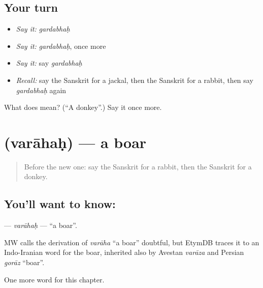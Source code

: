 \subsection*{Your turn}
\begin{itemize}
\raggedright
  \item \emph{Say it:} \emph{gardabhaḥ}
  \item \emph{Say it:} \emph{gardabhaḥ}, once more
  \item \emph{Say it:} say \emph{gardabhaḥ}
  \item \emph{Recall:} say the Sanskrit for a jackal, then the Sanskrit for a rabbit, then say \emph{gardabhaḥ} again
\end{itemize}

\begin{tcolorbox}[breakable,colback=teal!4,colframe=teal!35!black,title={Before you move on}]
What does  mean? (\textquotedblleft{}A donkey\textquotedblright{}.) Say it once more.
\end{tcolorbox}
\section[\texorpdfstring{\sk{वराहः} (varāhaḥ)}{वराहः (varāhaḥ)}]{ (varāhaḥ) — a boar}

\label{lesson:SA-C113-varahah}



\begin{quote}
Before the new one: say the Sanskrit for a rabbit, then the Sanskrit for a donkey.
\end{quote}

\subsection*{You'll want to know: }
\textbf{} — \emph{varāhaḥ} — \textquotedblleft{}a boar\textquotedblright{}.

\begin{cousinweb}
MW calls the derivation of \emph{varāha} \textquotedblleft{}a boar\textquotedblright{} doubtful, but EtymDB traces it to an Indo-Iranian word for the boar, inherited also by Avestan \emph{varāza} and Persian \emph{gorāz} \textquotedblleft{}boar\textquotedblright{}.
\end{cousinweb}

\begin{grammarlens}[title={What you've built}]
One more word for this chapter.
\end{grammarlens}

